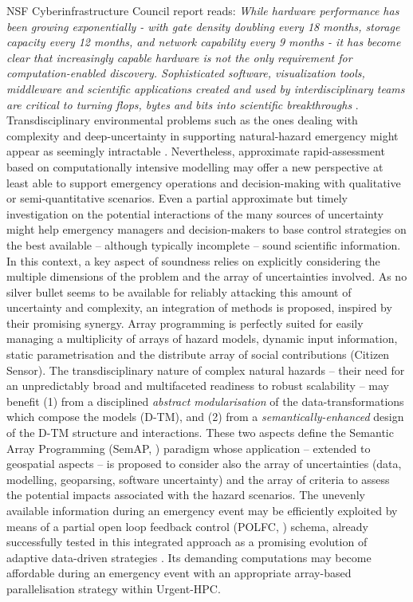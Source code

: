\documentclass[12pt]{article}
\begin{document}
\begin{center}
{{\noindent NSF Cyberinfrastructure Council report reads: \textit{While hardware performance has been growing exponentially - with gate density doubling every 18 months, storage capacity every 12 months, and network capability every 9 months - it has become clear that increasingly capable hardware is not the only requirement for computation-enabled discovery. Sophisticated software, visualization tools, middleware and scientific applications created and used by interdisciplinary teams are critical to turning flops, bytes and bits into scientific breakthroughs} \cite{NSFC2007}. Transdisciplinary environmental problems such as the ones dealing with complexity and deep-uncertainty in supporting natural-hazard emergency might appear as seemingly intractable \cite{Altay_Green_2006}. Nevertheless, approximate rapid-assessment based on computationally intensive modelling may offer a new perspective at least able to support emergency operations and decision-making with qualitative or semi-quantitative scenarios. Even a partial approximate but timely investigation on the potential interactions of the many sources of uncertainty might help emergency managers and decision-makers to base control strategies on the best available -- although typically incomplete -- sound scientific information. In this context, a key aspect of soundness relies on explicitly considering the multiple dimensions of the problem and the array of uncertainties involved. As no silver bullet seems to be available for reliably attacking this amount of uncertainty and complexity, an integration of methods is proposed, inspired by their promising synergy. Array programming is perfectly suited for easily managing a multiplicity of arrays of hazard models, dynamic input information, static parametrisation and the distribute array of social contributions (Citizen Sensor). The transdisciplinary nature of complex natural hazards -- their need for an unpredictably broad and multifaceted readiness to robust scalability -- may benefit (1) from a disciplined \textit{abstract modularisation} of the data-transformations which compose the models (D-TM), and (2) from a \textit{semantically-enhanced} design of the D-TM structure and interactions. These two aspects define the Semantic Array Programming (SemAP, \cite{deRigo2012,deRigo2012b}) paradigm whose application -- extended to geospatial aspects \cite{GeoSemAP_2013} -- is proposed to consider also the array of uncertainties (data, modelling, geoparsing, software uncertainty) and the array of criteria to assess the potential impacts associated with the hazard scenarios. The unevenly available information during an emergency event may be efficiently exploited by means of a partial open loop feedback control (POLFC, \cite{Castelletti2008}) schema, already successfully tested in this integrated approach \cite{de_Rigo_etal_IFIP2013,DiLeo_etal_2013,RodriguezAseretto_etal_2013} as a promising evolution of adaptive data-driven strategies \cite{RodriguezAseretto_etal_2008}. Its demanding computations may become affordable during an emergency event with an appropriate array-based parallelisation strategy within Urgent-HPC. 


}}
\end{center}
\end{document}
